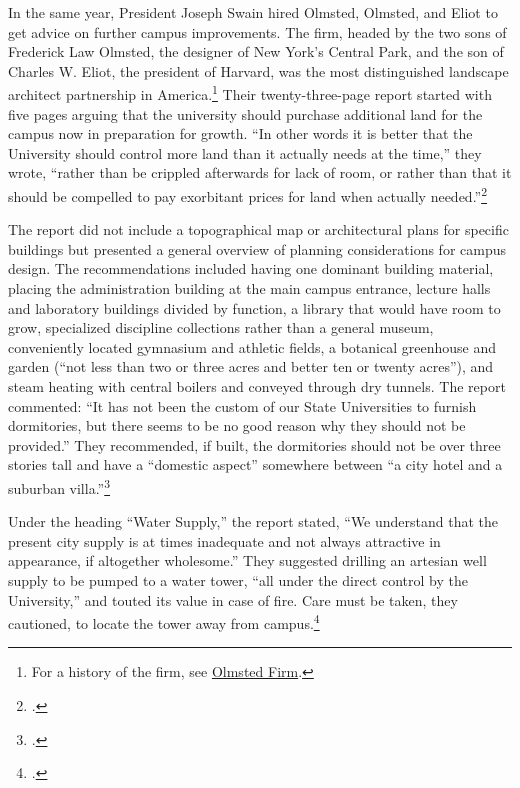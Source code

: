 \documentclass[
  american,
  letterpaper,
]{scrreprt}
\begin{document}
In the same year, President Joseph Swain hired Olmsted, Olmsted, and
Eliot to get advice on further campus improvements. The firm, headed by
the two sons of Frederick Law Olmsted, the designer of New York's
Central Park, and the son of Charles W. Eliot, the president of Harvard,
was the most distinguished landscape architect partnership in
America.\footnote{For a history of the firm, see
  \href{https://olmsted.org/colleagues-firm/olmsted-firm/}{Olmsted
  Firm}.} Their twenty-three-page report started with five pages arguing
that the university should purchase additional land for the campus now
in preparation for growth. ``In other words it is better that the
University should control more land than it actually needs at the
time,'' they wrote, ``rather than be crippled afterwards for lack of
room, or rather than that it should be compelled to pay exorbitant
prices for land when actually needed.''\footnote{.}

The report did not include a topographical map or architectural plans
for specific buildings but presented a general overview of planning
considerations for campus design. The recommendations included having
one dominant building material, placing the administration building at
the main campus entrance, lecture halls and laboratory buildings divided
by function, a library that would have room to grow, specialized
discipline collections rather than a general museum, conveniently
located gymnasium and athletic fields, a botanical greenhouse and garden
(``not less than two or three acres and better ten or twenty acres''),
and steam heating with central boilers and conveyed through dry tunnels.
The report commented: ``It has not been the custom of our State
Universities to furnish dormitories, but there seems to be no good
reason why they should not be provided.'' They recommended, if built,
the dormitories should not be over three stories tall and have a
``domestic aspect'' somewhere between ``a city hotel and a suburban
villa.''\footnote{.}

Under the heading ``Water Supply,'' the report stated, ``We understand
that the present city supply is at times inadequate and not always
attractive in appearance, if altogether wholesome.'' They suggested
drilling an artesian well supply to be pumped to a water tower, ``all
under the direct control by the University,'' and touted its value in
case of fire. Care must be taken, they cautioned, to locate the tower
away from campus.\footnote{.}
\end{document}
